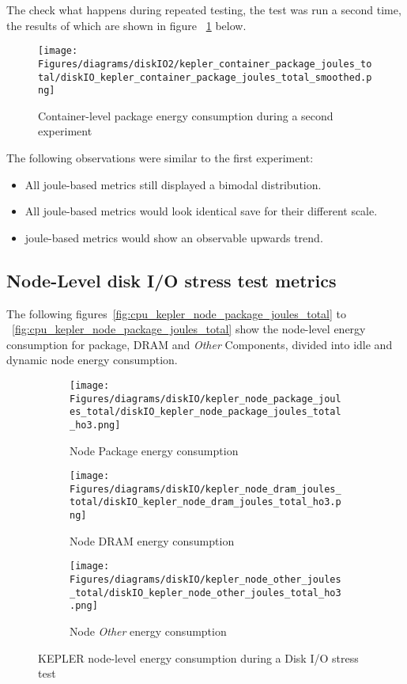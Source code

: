 The check what happens during repeated testing, the test was run a second time, the results of which are shown in figure ~\ref{fig:diskIO_kepler_container_cpu_joules_total_second_experiment} below.

\begin{figure}[H]
    \centering
    \texttt{[image: Figures/diagrams/diskIO2/kepler\_container\_package\_joules\_total/diskIO\_kepler\_container\_package\_joules\_total\_smoothed.png]}
    \caption[Container Package energy]{Container-level package energy consumption during a second experiment}
    \label{fig:diskIO_kepler_container_cpu_joules_total_second_experiment}
\end{figure}

The following observations were similar to the first experiment:
\begin{itemize}
\item All joule-based metrics still displayed a bimodal distribution.
\item All joule-based metrics would look identical save for their different scale.
\item joule-based metrics would show an observable upwards trend.
\end{itemize}

\subsection{Node-Level disk I/O stress test metrics}

The following figures~\ref{fig:cpu_kepler_node_package_joules_total} to ~\ref{fig:cpu_kepler_node_package_joules_total} show the node-level energy consumption for package, DRAM and \textit{Other} Components, divided into  idle and dynamic node energy consumption.

\begin{figure}[H]
    \centering
    \begin{subfigure}{1\textwidth}
        \texttt{[image: Figures/diagrams/diskIO/kepler\_node\_package\_joules\_total/diskIO\_kepler\_node\_package\_joules\_total\_ho3.png]}
        \caption{Node Package energy consumption}
        \label{fig:diskIO_kepler_node_package_joules_total}
    \end{subfigure}
    \begin{subfigure}{0.49\textwidth}
        \texttt{[image: Figures/diagrams/diskIO/kepler\_node\_dram\_joules\_total/diskIO\_kepler\_node\_dram\_joules\_total\_ho3.png]}
        \caption{Node DRAM energy consumption}
        \label{fig:diskIO_kepler_node_dram_joules_total}
    \end{subfigure}
    \begin{subfigure}{0.49\textwidth}
        \texttt{[image: Figures/diagrams/diskIO/kepler\_node\_other\_joules\_total/diskIO\_kepler\_node\_other\_joules\_total\_ho3.png]}
        \caption{Node \textit{Other} energy consumption}
        \label{fig:diskIO_kepler_node_other_joules_total}
    \end{subfigure}
    \caption[Node-Level Energy Consumption]{KEPLER node-level energy consumption during a Disk I/O stress test}
\end{figure}

